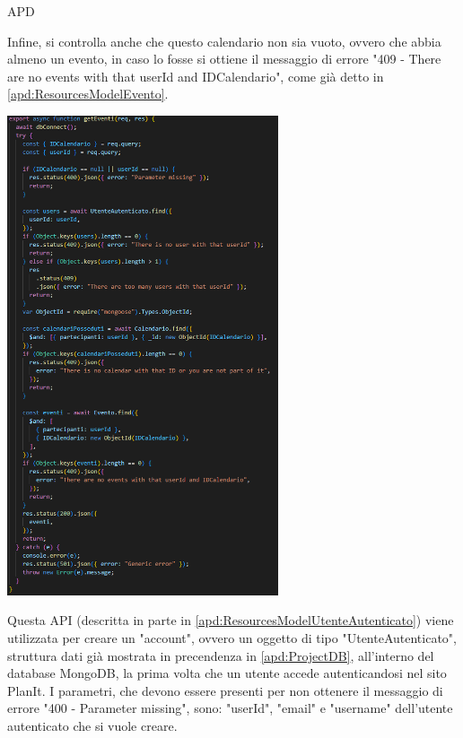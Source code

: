 \begin{listaPersonale} {APD}
\begin{listaPersonale2}[APD]{}
                Infine, si controlla anche che questo calendario non sia vuoto, ovvero che abbia almeno un evento, in caso lo fosse si ottiene il messaggio di errore "409 - There are no events with that userId and IDCalendario", come già detto in \ref{apd:ResourcesModelEvento}.
                \begin{center}
                    \includegraphics[width=0.60\textwidth, height=0.70\textheight]{img/png/APIs/getEventi.png}
                \end{center}
                Questa API (descritta in parte in \ref{apd:ResourcesModelUtenteAutenticato}) viene utilizzata per creare un "account", ovvero un oggetto di tipo "UtenteAutenticato", struttura dati già mostrata in precendenza in \ref{apd:ProjectDB}, all'interno del database MongoDB, la prima volta che un utente accede autenticandosi nel sito PlanIt. I parametri, che devono essere presenti per non ottenere il messaggio di errore "400 - Parameter missing", sono: "userId", "email" e "username" dell'utente autenticato che si vuole creare. \\

\end{listaPersonale2}
\end{listaPersonale}
